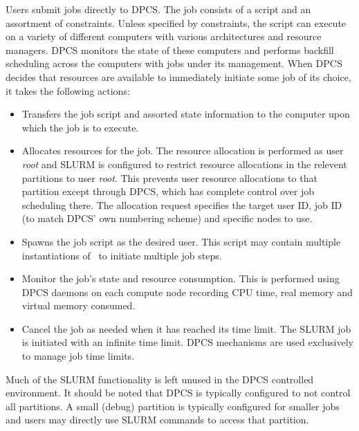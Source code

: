 Users submit jobs directly to DPCS.
The job consists of a script and an assortment of constraints. 
Unless specified by constraints, the script can execute on 
a variety of different computers with various architectures 
and resource managers. 
DPCS monitors the state of these computers and performs backfill 
scheduling across the computers with jobs under its management. 
When DPCS decides that resources are available to immediately 
initiate some job of its choice, it takes the following 
actions:
\begin{itemize}
\item Transfers the job script and assorted state information to 
the computer upon which the job is to execute.

\item Allocates resources for the job. 
The resource allocation is performed as user {\em root} and SLURM 
is configured to restrict resource allocations in the relevent 
partitions to user {\em root}.
This prevents user resource allocations to that partition
except through DPCS, which has complete control over job 
scheduling there.
The allocation request specifies the target user ID, job ID 
(to match DPCS' own numbering scheme) and specific nodes to use.

\item Spawns the job script as the desired user.
This script may contain multiple instantiations of \srun\ 
to initiate multiple job steps. 

\item Monitor the job's state and resource consumption. 
This is performed using DPCS daemons on each compute node 
recording CPU time, real memory and virtual memory consumed. 

\item Cancel the job as needed when it has reached its time limit. 
The SLURM job is initiated with an infinite time limit. 
DPCS mechanisms are used exclusively to manage job time limits. 

\end{itemize}

Much of the SLURM functionality is left unused in the DPCS 
controlled environment. 
It should be noted that DPCS is typically configured to not 
control all partitions. 
A small (debug) partition is typically configured for smaller 
jobs and users may directly use SLURM commands to access that 
partition.
